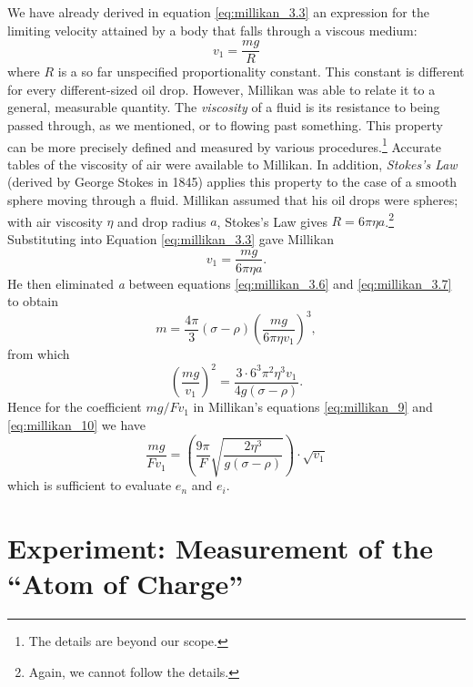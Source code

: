 We have already derived in equation \eqref{eq:millikan_3.3} an expression for the limiting 
velocity attained by a body that falls through a viscous medium:
%
\begin{equation*}\tag{3.3}
v_1 = \frac{mg}{R}
\end{equation*}
%
where $R$ is a so far unspecified proportionality constant. This
constant is different for every different-sized oil drop. However,
Millikan was able to relate it to a general, measurable quantity. The
\emph{viscosity} of a fluid is its resistance to being passed through,
as we mentioned, or to flowing past something. This property can be more
precisely defined and measured by various procedures.\footnote{The
  details are beyond our scope.} Accurate tables of the viscosity of air
were available to Millikan. In addition, \emph{Stokes's Law} (derived by
George Stokes in 1845) applies this property to the case of a smooth
sphere moving through a fluid. Millikan assumed that his oil drops were
spheres; with air viscosity $\eta$ and drop radius $a$, Stokes's
Law gives $R = 6\pi \eta a$.\footnote{Again, we cannot follow the
  details.} Substituting into Equation \eqref{eq:millikan_3.3} gave Millikan
%
\begin{equation*}\tag{3.7}
v_1 = \frac{mg}{6\pi\eta a}.\label{eq:millikan_3.7}
\end{equation*}
%
He then eliminated \emph{a} between equations \eqref{eq:millikan_3.6} and \eqref{eq:millikan_3.7} to obtain
%
\begin{equation*}
m = \frac{4\pi}{3}(\sigma\!-\!\rho)\left(\frac{mg}{6\pi\eta v_1}\right)^3,
\end{equation*}
%
from which
%
\begin{equation*}
\left(\frac{mg}{v_1}\right)^2 = \frac{3\cdot6^3\pi^2\eta^3{v}_1}{4g(\sigma\!-\!\rho)}.
\end{equation*}
%
Hence for the coefficient $mg/Fv_1$ in Millikan's equations \eqref{eq:millikan_9} and \eqref{eq:millikan_10} we have
%
\begin{equation*}\tag{3.8}
\frac{mg}{Fv_1} = \left(\frac{9\pi}{F}\sqrt{\frac{2\eta^3}{g(\sigma\!-\!\rho)}}\right)\cdot\sqrt{v_1} \label{eq:millikan_3.8}
\end{equation*}
%
which is sufficient to evaluate $e_n$ and $e_i$.

\section*{Experiment: Measurement of the ``Atom of Charge''}

